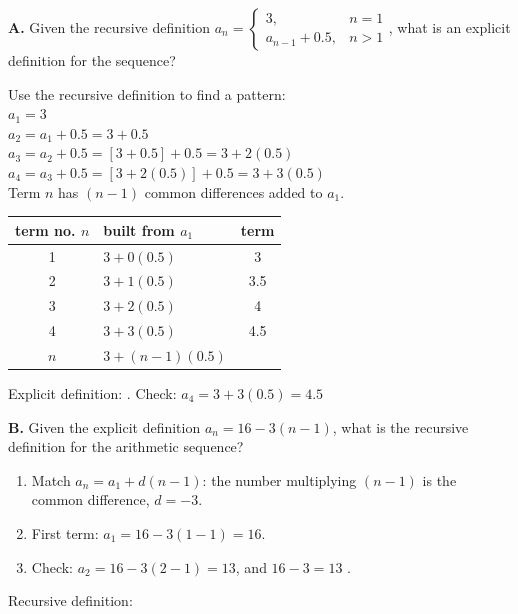\textbf{A.} Given the recursive definition $a_n=\begin{cases}3, & n=1\\ a_{n-1}+0.5, & n>1\end{cases}$, what is an explicit definition for the sequence?

\begin{minipage}[t]{0.53\textwidth}
\vspace{0pt}
Use the recursive definition to find a pattern:\\[2pt]
$a_1=3$\\
$a_2=a_1+0.5=3+0.5$\\
$a_3=a_2+0.5=[3+0.5]+0.5=3+2(0.5)$\\
$a_4=a_3+0.5=[3+2(0.5)]+0.5=3+3(0.5)$\\[2pt]
Term $n$ has $(n-1)$ common differences added to $a_1$.
\end{minipage}\hfill
\begin{minipage}[t]{0.43\textwidth}
\vspace{0pt}
\small\renewcommand{\arraystretch}{1.15}%
\begin{tabular}{|c|l|c|}
\hline
\textbf{term no.} $n$ & \textbf{built from $a_1$} & \textbf{term} \\ \hline
1 & $3+0(0.5)$ & 3 \\
2 & $3+1(0.5)$ & 3.5 \\
3 & $3+2(0.5)$ & 4 \\
4 & $3+3(0.5)$ & 4.5 \\
$n$ & $3+(n-1)(0.5)$ & \\ \hline
\end{tabular}
\end{minipage}

\vspace{4pt}
Explicit definition: . Check: $a_4=3+3(0.5)=4.5$ \checkmark

\textbf{B.} Given the explicit definition $a_n=16-3(n-1)$, what is the recursive definition for the arithmetic sequence?

\begin{minipage}[t]{0.56\textwidth}
\vspace{0pt}
\begin{enumerate}[label=\arabic*.]
\item Match $a_n=a_1+d(n-1)$: the number multiplying $(n-1)$ is the common difference, $d=-3$.
\item First term: $a_1=16-3(1-1)=16$.
\item Check: $a_2=16-3(2-1)=13$, and $16-3=13$ \checkmark.
\end{enumerate}
\end{minipage}\hfill
\begin{minipage}[t]{0.40\textwidth}
\vspace{0pt}
Recursive definition:\\[3pt]
\end{minipage}

